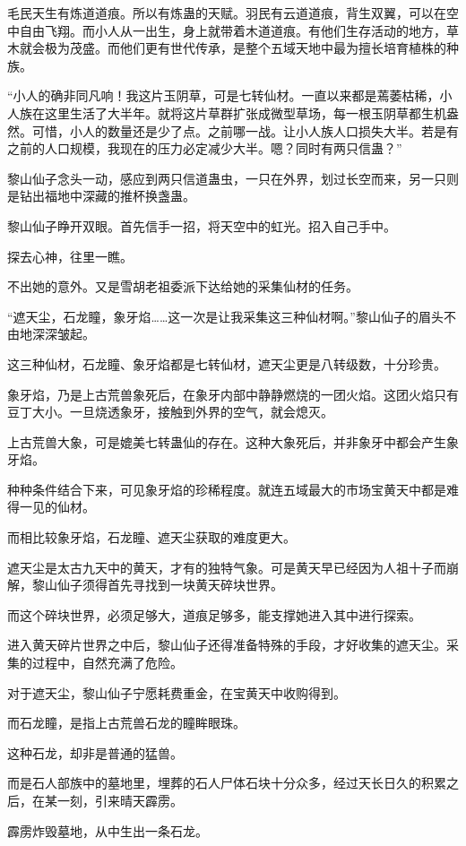 \begin{this_body}
毛民天生有炼道道痕。所以有炼蛊的天赋。羽民有云道道痕，背生双翼，可以在空中自由飞翔。而小人从一出生，身上就带着木道道痕。有他们生存活动的地方，草木就会极为茂盛。而他们更有世代传承，是整个五域天地中最为擅长培育植株的种族。

“小人的确非同凡响！我这片玉阴草，可是七转仙材。一直以来都是蔫萎枯稀，小人族在这里生活了大半年。就将这片草群扩张成微型草场，每一根玉阴草都生机盎然。可惜，小人的数量还是少了点。之前哪一战。让小人族人口损失大半。若是有之前的人口规模，我现在的压力必定减少大半。嗯？同时有两只信蛊？”

黎山仙子念头一动，感应到两只信道蛊虫，一只在外界，划过长空而来，另一只则是钻出福地中深藏的推杯换盏蛊。

黎山仙子睁开双眼。首先信手一招，将天空中的虹光。招入自己手中。

探去心神，往里一瞧。

不出她的意外。又是雪胡老祖委派下达给她的采集仙材的任务。

“遮天尘，石龙瞳，象牙焰……这一次是让我采集这三种仙材啊。”黎山仙子的眉头不由地深深皱起。

这三种仙材，石龙瞳、象牙焰都是七转仙材，遮天尘更是八转级数，十分珍贵。

象牙焰，乃是上古荒兽象死后，在象牙内部中静静燃烧的一团火焰。这团火焰只有豆丁大小。一旦烧透象牙，接触到外界的空气，就会熄灭。

上古荒兽大象，可是媲美七转蛊仙的存在。这种大象死后，并非象牙中都会产生象牙焰。

种种条件结合下来，可见象牙焰的珍稀程度。就连五域最大的市场宝黄天中都是难得一见的仙材。

而相比较象牙焰，石龙瞳、遮天尘获取的难度更大。

遮天尘是太古九天中的黄天，才有的独特气象。可是黄天早已经因为人祖十子而崩解，黎山仙子须得首先寻找到一块黄天碎块世界。

而这个碎块世界，必须足够大，道痕足够多，能支撑她进入其中进行探索。

进入黄天碎片世界之中后，黎山仙子还得准备特殊的手段，才好收集的遮天尘。采集的过程中，自然充满了危险。

对于遮天尘，黎山仙子宁愿耗费重金，在宝黄天中收购得到。

而石龙瞳，是指上古荒兽石龙的瞳眸眼珠。

这种石龙，却非是普通的猛兽。

而是石人部族中的墓地里，埋葬的石人尸体石块十分众多，经过天长日久的积累之后，在某一刻，引来晴天霹雳。

霹雳炸毁墓地，从中生出一条石龙。


\end{this_body}
